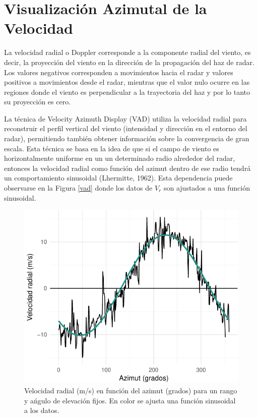 \documentclass[12pt,spanish,oneside, a4paper]{book}
\begin{document}
\section{\texorpdfstring{Visualización Azimutal de la Velocidad
\label{sec-vad}}{Visualización Azimutal de la Velocidad }}\label{visualizacion-azimutal-de-la-velocidad}

La velocidad radial o Doppler corresponde a la componente radial del
viento, es decir, la proyección del viento en la dirección de la
propagación del haz de radar. Los valores negativos corresponden a
movimientos hacia el radar y valores positivos a movimientos desde el
radar, mientras que el valor nulo ocurre en las regiones donde el viento
es perpendicular a la trayectoria del haz y por lo tanto su proyección
es cero.

La técnica de Velocity Azimuth Display (VAD) utiliza la velocidad radial
para reconstruir el perfil vertical del viento (intensidad y dirección
en el entorno del radar), permitiendo también obtener información sobre
la convergencia de gran escala. Esta técnica se basa en la idea de que
si el campo de viento es horizontalmente uniforme en un un determinado
radio alrededor del radar, entonces la velocidad radial como función del
azimut dentro de ese radio tendrá un comportamiento sinusoidal
(Lhermitte, 1962). Esta dependencia puede observarse en la Figura
\ref{vad} donde los datos de \(V_r\) son ajustados a una función
sinusoidal.

\begin{figure}

{\centering \includegraphics{Tesis_files/figure-latex/vad-1} 

}

\caption{Velocidad radial (m/s) en función del azimut (grados) para un rango y ańgulo de elevación fijos. En color se  ajusta una función sinusoidal a los datos. \label{vad}}\label{fig:vad}
\end{figure}
\end{document}
